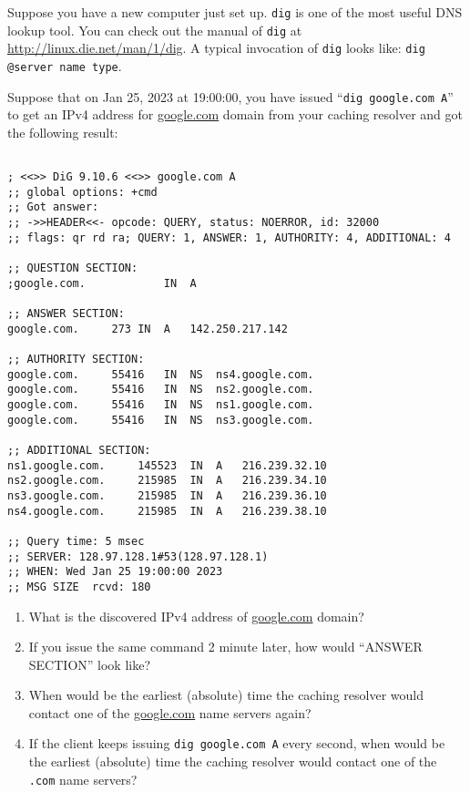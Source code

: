 \documentclass{report}
\begin{document}
\mktitle

\begin{problem}

Suppose you have a new computer just set up. \verb|dig| is one of the most useful DNS lookup tool.
You can check out the manual of \verb|dig| at \url{http://linux.die.net/man/1/dig}.
A typical invocation of \verb|dig| looks like:
\verb|dig @server name type|.

Suppose that on Jan 25, 2023 at 19:00:00, you have issued ``\verb|dig google.com A|'' to get an IPv4 address for \url{google.com} domain from your caching resolver and got the following result:

\begin{lstlisting}

; <<>> DiG 9.10.6 <<>> google.com A
;; global options: +cmd
;; Got answer:
;; ->>HEADER<<- opcode: QUERY, status: NOERROR, id: 32000
;; flags: qr rd ra; QUERY: 1, ANSWER: 1, AUTHORITY: 4, ADDITIONAL: 4

;; QUESTION SECTION:
;google.com.			IN	A

;; ANSWER SECTION:
google.com.		273	IN	A	142.250.217.142

;; AUTHORITY SECTION:
google.com.		55416	IN	NS	ns4.google.com.
google.com.		55416	IN	NS	ns2.google.com.
google.com.		55416	IN	NS	ns1.google.com.
google.com.		55416	IN	NS	ns3.google.com.

;; ADDITIONAL SECTION:
ns1.google.com.		145523	IN	A	216.239.32.10
ns2.google.com.		215985	IN	A	216.239.34.10
ns3.google.com.		215985	IN	A	216.239.36.10
ns4.google.com.		215985	IN	A	216.239.38.10

;; Query time: 5 msec
;; SERVER: 128.97.128.1#53(128.97.128.1)
;; WHEN: Wed Jan 25 19:00:00 2023
;; MSG SIZE  rcvd: 180

\end{lstlisting}

\begin{enumerate}

\item What is the discovered IPv4 address of \url{google.com} domain?

\item If you issue the same command 2 minute later, how would ``ANSWER SECTION'' look like?

\item When would be the earliest (absolute) time the caching resolver would contact one of the \url{google.com} name servers again?

\item If the client keeps issuing \texttt{dig google.com A} every second, when would be the earliest (absolute) time the caching resolver would contact one of the \texttt{.com} name servers?


\end{enumerate}
\end{problem}
\end{document}
